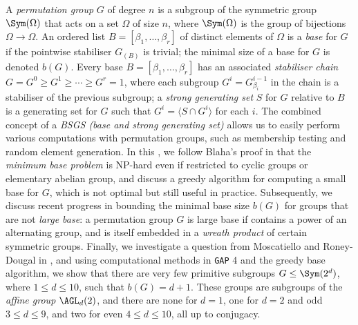 A \textit{permutation group} $G$ of degree $n$ is a subgroup of the symmetric group $\Sym(\Omega)$ that acts on a set $\Omega$ of size $n$, where $\Sym(\Omega)$ is the group of bijections $\Omega \to \Omega$. An ordered list $B = [\beta_1,\dotsc,\beta_r]$ of distinct elements of $\Omega$ is a \textit{base} for $G$ if the pointwise stabiliser $G_{(B)}$ is trivial; the minimal size of a base for $G$ is denoted $b(G)$. Every base $B = [\beta_1,\dotsc,\beta_r]$ has an associated \textit{stabiliser chain} $G = G^0 \geq G^1 \geq \dotsb \geq G^r = 1$, where each subgroup $G^i = G^{i-1}_{\beta_i}$ in the chain is a stabiliser of the previous subgroup; a \textit{strong generating set} $S$ for $G$ relative to $B$ is a generating set for $G$ such that $G^i = \langle S \cap G^i \rangle$ for each $i$. The combined concept of a \textit{BSGS (base and strong generating set)} allows us to easily perform various computations with permutation groups, such as membership testing and random element generation. In this \thesis{}, we follow Blaha's proof in \cite{blaha1992} that the \textit{minimum base problem} is NP-hard even if restricted to cyclic groups or elementary abelian group, and discuss a greedy algorithm for computing a small base for $G$, which is not optimal but still useful in practice. Subsequently, we discuss recent progress in bounding the minimal base size $b(G)$ for groups that are not \textit{large base}: a permutation group $G$ is large base if contains a power of an alternating group, and is itself embedded in a \textit{wreath product} of certain symmetric groups. Finally, we investigate a question from Moscatiello and Roney-Dougal in \cite{moscatiello_roney-dougal2021}, and using computational methods in \texttt{GAP} 4 and the greedy base algorithm, we show that there are very few primitive subgroups $G \leq \Sym(2^d)$, where $1 \leq d \leq 10$, such that $b(G) = d + 1$. These groups are subgroups of the \textit{affine group} $\AGL_d(2)$, and there are none for $d = 1$, one for $d = 2$ and odd $3 \leq d \leq 9$, and two for even $4 \leq d \leq 10$, all up to conjugacy.
